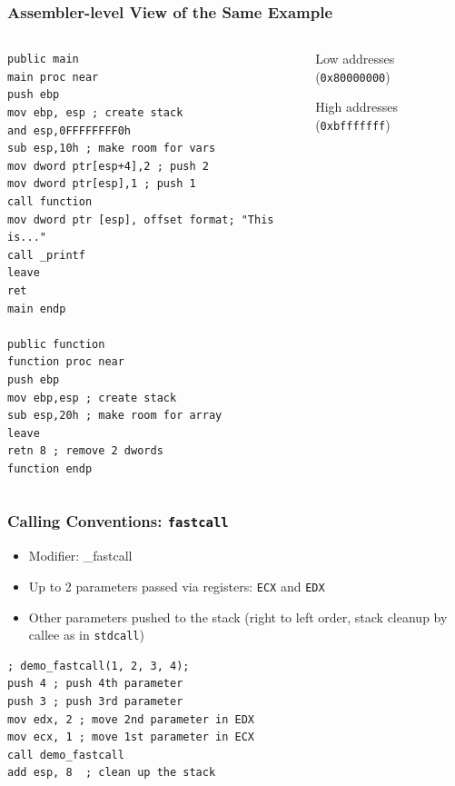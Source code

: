 \documentclass[]{beamer}
\begin{document}
\begin{frame}[fragile]
  \frametitle{Assembler-level View of the Same Example}
  \begin{columns}
    \begin{column}{.5\textwidth}

\begin{lstlisting}[language={[x86masm]Assembler},basicstyle=\tiny\ttfamily]
public main
main proc near
push ebp
mov ebp, esp ; create stack
and esp,0FFFFFFFF0h
sub esp,10h ; make room for vars
mov dword ptr[esp+4],2 ; push 2
mov dword ptr[esp],1 ; push 1
call function
mov dword ptr [esp], offset format; "This is..."
call _printf
leave
ret
main endp

public function
function proc near
push ebp
mov ebp,esp ; create stack
sub esp,20h ; make room for array
leave
retn 8 ; remove 2 dwords
function endp
\end{lstlisting}
    \end{column}

    \begin{column}{.5\textwidth}
    	\centering
    	\par{\scriptsize Low addresses ({\tt 0x80000000})}\\[.5em]
	\begin{drawstack}[scale=0.7, font=\footnotesize]
	\startframe
	\end{drawstack}
	\par{\scriptsize High addresses ({\tt 0xbfffffff})}
     \end{column}
  \end{columns}
  \begin{figure}
  \end{figure}
\end{frame}

\begin{frame}[fragile]
  \frametitle{Calling Conventions: {\tt fastcall}}
  \begin{itemize}
  \item Modifier: \alert{\_fastcall}
  \item Up to 2 parameters passed via registers: {\tt ECX} and {\tt EDX}
  \item Other parameters pushed to the stack (right to left order, stack cleanup by callee as in {\tt stdcall})
  \end{itemize}
\begin{lstlisting}[language={[x86masm]Assembler}]
; demo_fastcall(1, 2, 3, 4);
push 4 ; push 4th parameter
push 3 ; push 3rd parameter
mov edx, 2 ; move 2nd parameter in EDX
mov ecx, 1 ; move 1st parameter in ECX
call demo_fastcall
add esp, 8  ; clean up the stack
\end{lstlisting}
\end{frame}
\end{document}
